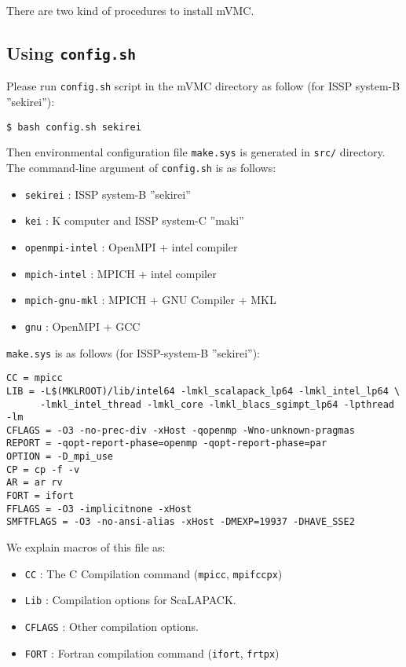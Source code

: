 There are two kind of procedures to install mVMC.

\subsection{Using \texttt{config.sh}}

Please run \verb|config.sh| script in the mVMC directory as follow
(for ISSP system-B ''sekirei''):
\begin{verbatim}
$ bash config.sh sekirei
\end{verbatim}
Then environmental configuration file \verb|make.sys| is generated in 
\verb|src/| directory.
The command-line argument of \verb|config.sh| is as follows:
\begin{itemize}
\item \verb|sekirei| : ISSP system-B ''sekirei''
\item \verb|kei| : K computer and ISSP system-C ''maki''
\item \verb|openmpi-intel| : OpenMPI + intel compiler
\item \verb|mpich-intel| : MPICH + intel compiler
\item \verb|mpich-gnu-mkl| : MPICH + GNU Compiler + MKL
\item \verb|gnu| : OpenMPI + GCC
\end{itemize}

\verb|make.sys| is as follows (for ISSP-system-B ''sekirei''):
\begin{verbatim}
CC = mpicc
LIB = -L$(MKLROOT)/lib/intel64 -lmkl_scalapack_lp64 -lmkl_intel_lp64 \
      -lmkl_intel_thread -lmkl_core -lmkl_blacs_sgimpt_lp64 -lpthread -lm
CFLAGS = -O3 -no-prec-div -xHost -qopenmp -Wno-unknown-pragmas
REPORT = -qopt-report-phase=openmp -qopt-report-phase=par
OPTION = -D_mpi_use
CP = cp -f -v
AR = ar rv
FORT = ifort
FFLAGS = -O3 -implicitnone -xHost
SMFTFLAGS = -O3 -no-ansi-alias -xHost -DMEXP=19937 -DHAVE_SSE2
\end{verbatim}
We explain macros of this file as: 
\begin{itemize}
\item \verb|CC| : The C Compilation command (\verb|mpicc|, \verb|mpifccpx|)
\item \verb|Lib| : Compilation options for ScaLAPACK.
\item \verb|CFLAGS| : Other compilation options.
\item \verb|FORT| : Fortran compilation command (\verb|ifort|, \verb|frtpx|)
\end{itemize}


